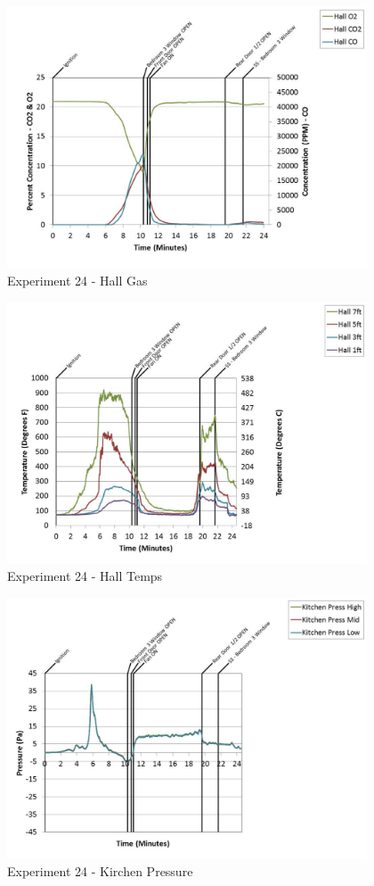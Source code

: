\documentclass{article}
\begin{document}
\begin{appendices}
	\clearpage

	\begin{figure}[h!]
		\centering
		\includegraphics[height=3.05in]{0_Images/Results_Charts/Exp_24_Charts/HallGas.pdf}
		\caption{Experiment 24 - Hall Gas}
	\end{figure}
 

	\begin{figure}[h!]
		\centering
		\includegraphics[height=3.05in]{0_Images/Results_Charts/Exp_24_Charts/HallTemps.pdf}
		\caption{Experiment 24 - Hall Temps}
	\end{figure}
 
	\clearpage

	\begin{figure}[h!]
		\centering
		\includegraphics[height=3.05in]{0_Images/Results_Charts/Exp_24_Charts/KirchenPressure.pdf}
		\caption{Experiment 24 - Kirchen Pressure}
	\end{figure}
 


\end{appendices}
\end{document}
